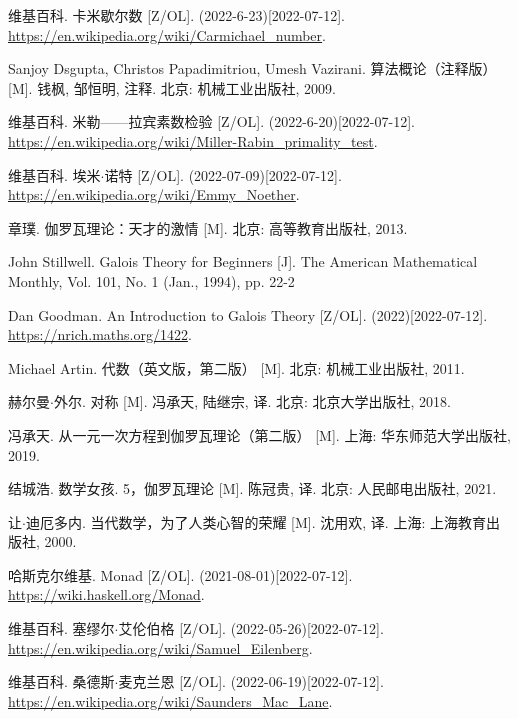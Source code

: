 \documentclass[UTF8]{article}
\begin{document}
\begin{thebibliography}{99}
维基百科. 卡米歇尔数 [Z/OL]. (2022-6-23)[2022-07-12]. \url{https://en.wikipedia.org/wiki/Carmichael_number}.

Sanjoy Dsgupta, Christos Papadimitriou, Umesh Vazirani. 算法概论（注释版） [M]. 钱枫, 邹恒明, 注释. 北京: 机械工业出版社, 2009. %

维基百科. 米勒——拉宾素数检验 [Z/OL]. (2022-6-20)[2022-07-12]. \url{https://en.wikipedia.org/wiki/Miller-Rabin_primality_test}.

维基百科. 埃米$\cdot$诺特 [Z/OL]. (2022-07-09)[2022-07-12]. \url{https://en.wikipedia.org/wiki/Emmy_Noether}.

章璞. 伽罗瓦理论：天才的激情 [M]. 北京: 高等教育出版社, 2013. %

John Stillwell. Galois Theory for Beginners  [J]. The American Mathematical Monthly, Vol. 101, No. 1 (Jan., 1994), pp. 22-2

Dan Goodman. An Introduction to Galois Theory [Z/OL]. (2022)[2022-07-12]. \url{https://nrich.maths.org/1422}.

Michael Artin. 代数（英文版，第二版） [M]. 北京: 机械工业出版社, 2011. %

赫尔曼$\cdot$外尔. 对称 [M]. 冯承天, 陆继宗, 译. 北京: 北京大学出版社, 2018. %

冯承天. 从一元一次方程到伽罗瓦理论（第二版） [M]. 上海: 华东师范大学出版社, 2019. %

结城浩. 数学女孩. 5，伽罗瓦理论 [M]. 陈冠贵, 译. 北京: 人民邮电出版社, 2021. %


让$\cdot$迪厄多内. 当代数学，为了人类心智的荣耀 [M]. 沈用欢, 译. 上海: 上海教育出版社, 2000. %

哈斯克尔维基. Monad [Z/OL]. (2021-08-01)[2022-07-12]. \url{https://wiki.haskell.org/Monad}.

维基百科. 塞缪尔$\cdot$艾伦伯格 [Z/OL]. (2022-05-26)[2022-07-12]. \url{https://en.wikipedia.org/wiki/Samuel_Eilenberg}.

维基百科. 桑德斯$\cdot$麦克兰恩 [Z/OL]. (2022-06-19)[2022-07-12]. \url{https://en.wikipedia.org/wiki/Saunders_Mac_Lane}.


\end{thebibliography}
\end{document}
